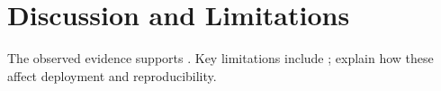 \section{Discussion and Limitations}
The observed evidence supports . Key limitations include ; explain how these affect deployment and reproducibility.

